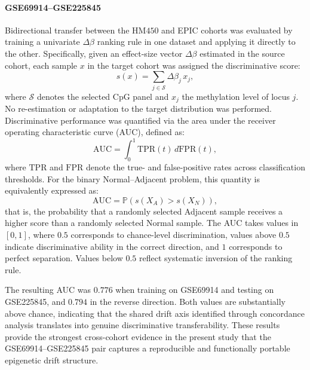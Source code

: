 \paragraph{GSE69914--GSE225845}
Bidirectional transfer between the HM$450$ and EPIC cohorts was 
evaluated by training a univariate $\Delta\beta$ ranking rule in one 
dataset and applying it directly to the other. 
Specifically, given an effect-size vector $\Delta\beta$ estimated 
in the source cohort, each sample $x$ in the target cohort was 
assigned the discriminative score:
\begin{equation}
s(x) = \sum_{j \in \mathcal{S}} \Delta\beta_j \, x_j ,
\end{equation}
where $\mathcal{S}$ denotes the selected CpG panel and $x_j$ the 
methylation level of locus $j$. 
No re-estimation or adaptation to the target distribution was performed.
Discriminative performance was quantified via the area under the 
receiver operating characteristic curve (AUC), defined as:
\begin{equation}
\mathrm{AUC}
=
\int_0^1 \mathrm{TPR}(t)\, d\mathrm{FPR}(t),
\end{equation}
where $\mathrm{TPR}$ and $\mathrm{FPR}$ denote the true- and false-positive 
rates across classification thresholds. 
For the binary Normal–Adjacent problem, this quantity is 
equivalently expressed as:
\begin{equation}
\mathrm{AUC}
=
\mathbb{P}\!\left(
s(X_{A}) > s(X_{N})
\right),
\end{equation}
that is, the probability that a randomly selected Adjacent sample 
receives a higher score than a randomly selected Normal sample. 
The AUC takes values in $[0,1]$, where $0.5$ corresponds to 
chance-level discrimination, values above $0.5$ indicate 
discriminative ability in the correct direction, and $1$ 
corresponds to perfect separation. Values below $0.5$ 
reflect systematic inversion of the ranking rule.

The resulting AUC was $0.776$ when training on GSE69914 and 
testing on GSE225845, and $0.794$ in the reverse direction. 
Both values are substantially above chance, indicating that the 
shared drift axis identified through concordance analysis 
translates into genuine discriminative transferability. 
These results provide the strongest cross-cohort evidence in 
the present study that the GSE69914--GSE225845 pair captures 
a reproducible and functionally portable epigenetic drift structure.

